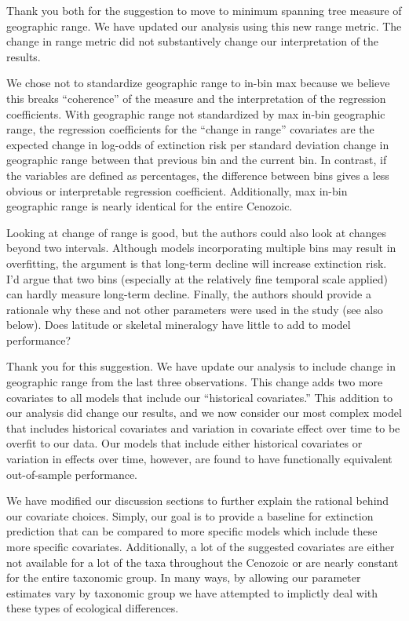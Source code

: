\documentclass[12pt,letterpaper]{article}
\begin{document}
\begin{refsection}
Thank you both for the suggestion to move to minimum spanning tree measure of geographic range. We have updated our analysis using this new range metric. The change in range metric did not substantively change our interpretation of the results.

We chose not to standardize geographic range to in-bin max because we believe this breaks ``coherence'' of the measure and the interpretation of the regression coefficients. With geographic range not standardized by max in-bin geographic range, the regression coefficients for the ``change in range'' covariates are the expected change in log-odds of extinction risk per standard deviation change in geographic range between that previous bin and the current bin. In contrast, if the variables are defined as percentages, the difference between bins gives a less obvious or interpretable regression coefficient. Additionally, max in-bin geographic range is nearly identical for the entire Cenozoic.


\begin{bfseries}
  Looking at change of range is good, but the authors could also look at changes beyond two intervals. Although models incorporating multiple bins may result in overfitting, the argument is that long-term decline will increase extinction risk. I’d argue that two bins (especially at the relatively fine temporal scale applied) can hardly measure long-term decline. Finally, the authors should provide a rationale why these and not other parameters were used in the study (see also below). Does latitude or skeletal mineralogy have little to add to model performance?
\end{bfseries}

Thank you for this suggestion. We have update our analysis to include change in geographic range from the last three observations. This change adds two more covariates to all models that include our ``historical covariates.'' This addition to our analysis did change our results, and we now consider our most complex model that includes historical covariates and variation in covariate effect over time to be overfit to our data. Our models that include either historical covariates or variation in effects over time, however, are found to have functionally equivalent out-of-sample performance.

We have modified our discussion sections to further explain the rational behind our covariate choices. Simply, our goal is to provide a baseline for extinction prediction that can be compared to more specific models which include these more specific covariates. Additionally, a lot of the suggested covariates are either not available for a lot of the taxa throughout the Cenozoic or are nearly constant for the entire taxonomic group. In many ways, by allowing our parameter estimates vary by taxonomic group we have attempted to implictly deal with these types of ecological differences.


\end{refsection}
\end{document}
